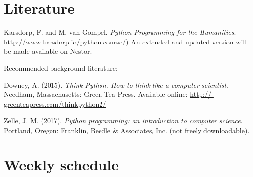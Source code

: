 \documentclass[a4paper,12pt]{article}
\begin{document}
\section{Literature}
Karsdorp, F. and M. van Gompel. \emph{Python Programming for the Humanities}.
\url{http://www.karsdorp.io/python-course/})
An extended and updated version will be made available on Nestor.


Recommended background literature:

Downey, A. (2015). \emph{Think Python. How to think like a computer scientist}.
Needham, Massachusetts: Green Tea Press.
Available online: \url{http://-greenteapress.com/thinkpython2/}

Zelle, J. M. (2017).
\emph{Python programming: an introduction to computer science}.
Portland, Oregon: Franklin, Beedle \& Associates, Inc.
(not freely downloadable).


\section{Weekly schedule}
\end{document}
